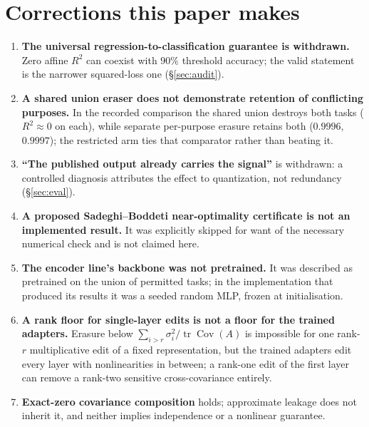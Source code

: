 \documentclass[conference]{IEEEtran}
\begin{document}
\section{Corrections this paper makes}
\label{sec:corrections}
\begin{enumerate}\itemsep2pt
\item \textbf{The universal regression-to-classification guarantee is withdrawn.} Zero affine $R^2$ can
coexist with $90\%$ threshold accuracy; the valid statement is the narrower squared-loss one
(\S\ref{sec:audit}).
\item \textbf{A shared union eraser does not demonstrate retention of conflicting purposes.} In the
recorded comparison the shared union destroys both tasks ($R^2\approx0$ on each), while separate
per-purpose erasure retains both ($0.9996$, $0.9997$); the restricted arm ties that comparator rather than
beating it.
\item \textbf{``The published output already carries the signal''} is withdrawn: a controlled diagnosis
attributes the effect to quantization, not redundancy (\S\ref{sec:eval}).
\item \textbf{A proposed Sadeghi--Boddeti near-optimality certificate is not an implemented result.}
It was explicitly skipped for want of the necessary numerical check and is not claimed here.
\item \textbf{The encoder line's backbone was not pretrained.} It was described as pretrained on the
union of permitted tasks; in the implementation that produced its results it was a seeded random MLP,
frozen at initialisation.
\item \textbf{A rank floor for single-layer edits is not a floor for the trained adapters.} Erasure below
$\sum_{i>r}\sigma_i^2/\operatorname{tr}\operatorname{Cov}(A)$ is impossible for one rank-$r$
multiplicative edit of a fixed representation, but the trained adapters edit every layer with
nonlinearities in between; a rank-one edit of the first layer can remove a rank-two sensitive
cross-covariance entirely.
\item \textbf{Exact-zero covariance composition} holds; approximate leakage does not inherit it, and
neither implies independence or a nonlinear guarantee.
\end{enumerate}
\end{document}
